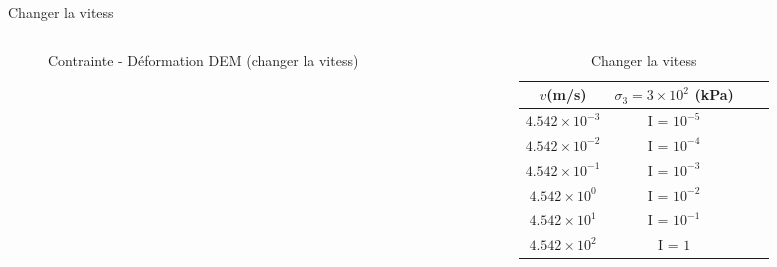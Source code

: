 \documentclass[10pt]{beamer}
\begin{document}
\begin{frame}{Changer la vitess}
    \begin{columns}
        \begin{column}{0.5\textwidth}
            \begin{figure}[h]
                \centering
                \scalebox{0.5}{}
                \caption{Contrainte - Déformation DEM (changer la vitess)}
            \end{figure}
        \end{column}
        \begin{column}{0.5\textwidth}
            \begin{table}
                \centering
                \begin{tabular}{|c|c|c|c|}
                    \hline
                    $v $(m/s)                & $ \sigma_3 = 3 \times 10^2$ (kPa) \\
                    \hline
                    $4.542   \times 10^{-3}$ & I = $10^{-5}$                     \\
                    \hline
                    $4.542   \times 10^{-2}$ & I = $10^{-4}$                     \\
                    \hline
                    $4.542   \times 10^{-1}$ & I = $10^{-3}$                     \\
                    \hline
                    $4.542   \times 10^{0}$  & I = $10^{-2}$                     \\
                    \hline
                    $4.542   \times 10^{1}$  & I = $10^{-1}$                     \\
                    \hline
                    $4.542   \times 10^{2}$  & I = $1$                           \\
                    \hline
                \end{tabular}
                \caption{Changer la vitess}
            \end{table}
        \end{column}
    \end{columns}
\end{frame}
\end{document}
